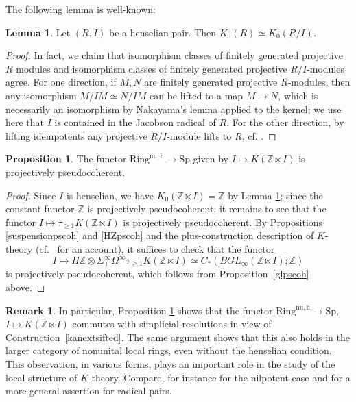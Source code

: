 \documentclass{amsart}
\newcommand{\Sp}{\mathrm{Sp}}
\theoremstyle{definition}
\newtheorem{proposition}[definition]{Proposition}
\newtheorem{lemma}[definition]{Lemma}
\newtheorem{remark}[definition]{Remark}
\newcommand{\nuzh}{\mathrm{Ring}^{\mathrm{nu,h}}}
\begin{document}
The following lemma is well-known:

\begin{lemma} 
\label{K0invhenspair}
Let $(R, I)$ be a henselian pair. Then $K_0(R) \simeq K_0(R/I)$. 
\end{lemma}
\begin{proof} 
In fact, we claim that isomorphism classes of finitely generated projective $R$
modules and isomorphism classes of finitely generated projective $R/I$-modules
agree. For one direction, if $M, N$ are finitely generated projective $R$-modules, then any
isomorphism $M/IM \simeq N/IM$ can be lifted to a map $M \to N$, which is
necessarily an isomorphism by Nakayama's lemma applied to the kernel; we use
here that  $I$ is contained in the
Jacobson radical of $R$. For the other direction, by lifting idempotents any
projective $R/I$-module lifts to $R$, cf. \cite[Tag 0D49]{stacks-project}. 
\end{proof} 

\begin{proposition} 
\label{Kpscoh}
The functor $\nuzh \to \Sp$ given by $I \mapsto K( \mathbb{Z} \ltimes I)$
is projectively pseudocoherent.
\end{proposition} 
\begin{proof} 
Since $I$ is henselian, we have $K_0( \mathbb{Z} \ltimes I) = \mathbb{Z}$ by Lemma \ref{K0invhenspair}; since the constant functor $\mathbb{Z}$ is projectively pseudocoherent, it remains to see 
that the functor $I \mapsto \tau_{\geq 1} K(\mathbb{Z} \ltimes I)$ is
projectively 
pseudocoherent. 
By Propositions  \ref{suspensionpscoh} and \ref{HZpscoh} and the
plus-construction description of $K$-theory (cf.~\cite[IV.1]{KBook} for an
account), it suffices to check that
the functor \[I \mapsto H \mathbb{Z} \otimes \Sigma^\infty_+ \Omega^\infty
\tau_{\geq 1} K(\mathbb{Z} \ltimes I) \simeq C_*(BGL_\infty(\mathbb{Z} \ltimes I);
\mathbb{Z})\] is projectively pseudocoherent, which follows from 
Proposition~\ref{glpscoh} above. 
\end{proof} 


\begin{remark} 
In particular, Proposition \ref{Kpscoh} shows that the functor $\nuzh \to \Sp$,
$I \mapsto K( \mathbb{Z} \ltimes I)$ commutes with simplicial resolutions in
view of Construction~\ref{kanextsifted}.  The same argument shows
that this also holds in the larger category of nonunital local rings, even
without the henselian condition.  This observation, in various forms, plays an important role in the study of the local structure of $K$-theory. Compare, for instance \cite[Lemma
I.2.2]{Goodrel} for the nilpotent case and \cite[Ch.~III, Prop.~1.4.2]{dgm}
for a more general assertion  for radical pairs. 
\end{remark} 
\end{document}
